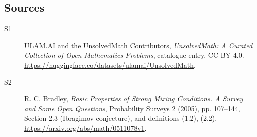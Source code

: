 \documentclass[11pt]{article}
\begin{document}
\subsection{Sources}
\begin{description}
\item[\hypertarget{source:statement:1}{S1}] ULAM.AI and the UnsolvedMath Contributors, \emph{UnsolvedMath: A Curated Collection of Open Mathematics Problems}, catalogue entry. CC BY 4.0. \url{https://huggingface.co/datasets/ulamai/UnsolvedMath}.
\item[\hypertarget{source:statement:2}{S2}] R. C. Bradley, \emph{Basic Properties of Strong Mixing Conditions. A Survey and Some Open Questions}, Probability Surveys 2 (2005), pp. 107--144, Section 2.3 (Ibragimov conjecture), and definitions (1.2), (2.2). \url{https://arxiv.org/abs/math/0511078v1}.
\end{description}
\label{end:statement}
\end{document}
